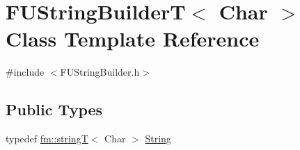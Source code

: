 \hypertarget{classFUStringBuilderT}{
\section{FUStringBuilderT$<$ Char $>$ Class Template Reference}
\label{classFUStringBuilderT}
}


{\ttfamily \#include $<$FUStringBuilder.h$>$}

\subsection*{Public Types}
\begin{DoxyCompactItemize}
\item 
typedef \hyperlink{classfm_1_1stringT}{fm::stringT}$<$ Char $>$ \hyperlink{classFUStringBuilderT_a2e14969ddb2b31c67625cb3b721d36c0}{String}
\end{DoxyCompactItemize}
